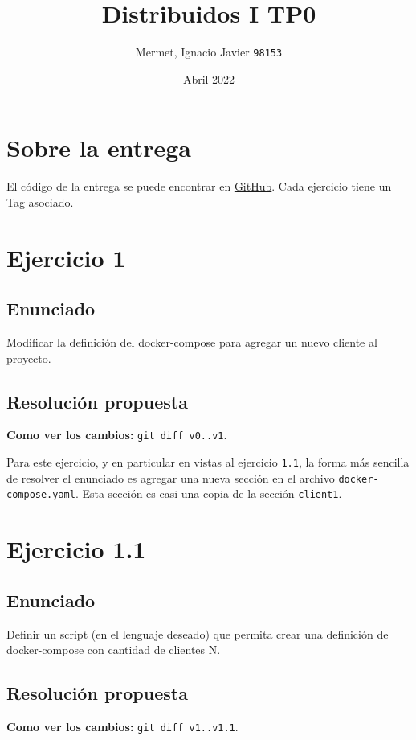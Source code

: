 \documentclass{article}
\title{Distribuidos I \- TP0}
\author{Mermet, Ignacio Javier \texttt{98153}}
\date{Abril 2022}
\begin{document}
\maketitle

\section{Sobre la entrega}
El código de la entrega se puede encontrar en \href{https://github.com/CrossNox/7574-TP0}{GitHub}. Cada ejercicio tiene un \href{https://github.com/CrossNox/7574-TP0/tags}{Tag} asociado.

\section{Ejercicio 1}
\subsection{Enunciado}
Modificar la definición del docker-compose para agregar un nuevo cliente al proyecto.

\subsection{Resolución propuesta}

\textbf{Como ver los cambios: }\texttt{git diff v0..v1}.

Para este ejercicio, y en particular en vistas al ejercicio \texttt{1.1}, la forma más sencilla de resolver el enunciado es agregar una nueva sección en el archivo \texttt{docker-compose.yaml}. Esta sección es casi una copia de la sección \texttt{client1}.

\section{Ejercicio 1.1}
\subsection{Enunciado}
Definir un script (en el lenguaje deseado) que permita crear una definición de docker-compose con cantidad de clientes N.

\subsection{Resolución propuesta}

\textbf{Como ver los cambios: }\texttt{git diff v1..v1.1}.
\end{document}
